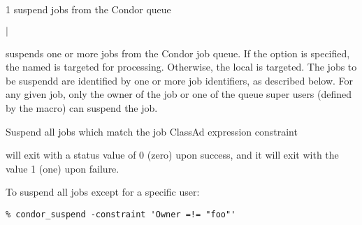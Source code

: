 \begin{ManPage}{\label{man-condor-suspend}}{1}
{suspend jobs from the Condor queue}
\Synopsis {}
\ToolArgsBase

\ToolDebugOption
\ToolLocate
\ToolJobs
$|$  \Dots

\ToolDebugOption
\ToolLocate
\ToolAll


\Description

 suspends one or more jobs from the Condor job queue.  
If the  option is specified, the named  is targeted
for processing.  
Otherwise, the local  is targeted.
The jobs to be suspendd are identified by one or more job identifiers, as
described below.
For any given job, only the owner of the job or one of the queue super users
(defined by the  macro) can suspend the job.

\begin{Options}
	\ToolArgsBaseDesc
	\ToolLocateDesc
    \ToolDebugDesc
	 {Suspend all jobs which match
	                the job ClassAd expression constraint}
\end{Options}

\ExitStatus

 will exit with a status value of 0 (zero) upon success,
and it will exit with the value 1 (one) upon failure.

\Examples
To suspend all jobs except for a specific user:
\footnotesize
\begin{verbatim}
% condor_suspend -constraint 'Owner =!= "foo"'
\end{verbatim}
\nosuspendalsize

\end{ManPage}
